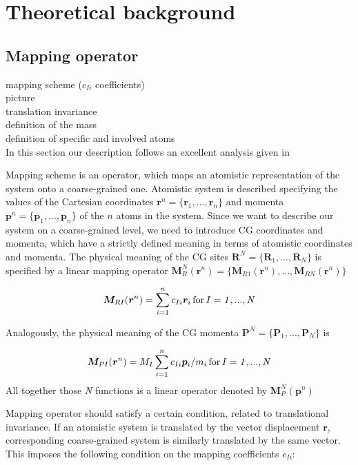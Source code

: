 \chapter{Theoretical background}

\section{Mapping operator}
\sasha
mapping scheme ($c_{Ii}$ coefficients) \\
picture \\
translation invariance \\
definition of the mass \\
definition of specific and involved atoms \\

In this section our description follows an excellent analysis given in \cite{Noid:2008.1}

Mapping scheme is an operator, which maps an atomistic representation of the system onto a coarse-grained one.
Atomistic system is described specifying the values of the Cartesian coordinates $\bm r^n = \{\bm r_1,...,\bm r_n\}$ and momenta 
$\bm p^n = \{\bm p_1,...,\bm p_n\}$ of the $n$ atoms in the system. Since we want to describe our system on a coarse-grained level, we need to introduce CG coordinates and momenta, which have a strictly defined meaning in terms of atomistic coordinates and momenta. The physical meaning of the CG sites $\bm R^N = \{\bm R_1,...,\bm R_N\}$ is specified by a linear mapping operator
$\bm M_R^N(\bm r^n) = \{\bm M_{R1}(\bm r^n),...,\bm M_{RN}(\bm r^n)\}$

\begin{equation}
 \bm M_{RI}(\bm r^n)=\sum_{i=1}^{n}c_{Ii}\bm r_i \, \rm for\, \it I = 1,...,N
\label{eq:mapping_scheme}
\end{equation}

Analogously, the physical meaning of the CG momenta $\bm P^N = \{\bm P_1,...,\bm P_N\}$ is

\begin{equation}
 \bm M_{PI}(\bm r^n)=M_I\sum_{i=1}^{n}c_{Ii}\bm p_i/m_i \, \rm for\, \it I = 1,...,N
\end{equation}
All together those {\it N} functions is a linear operator denoted by $\bm M_P^N(\bm p^n)$

Mapping operator should satisfy a certain condition, related to translational invariance. If an atomistic system is translated by the vector displacement $\bm r $, corresponding coarse-grained system is similarly translated by the same vector. This imposes the following condition on the mapping coefficients $ c_{Ii} $:

